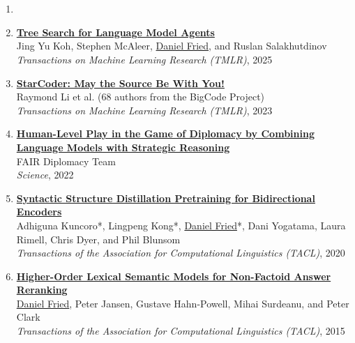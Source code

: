 \section{}

\begin{enumerate}[leftmargin=-1mm,partopsep=0pt]

\item[]

\item \href{https://arxiv.org/abs/2407.01476}{\textbf{Tree Search for Language Model Agents}} \\
  Jing Yu Koh, Stephen McAleer, \underline{Daniel Fried}, and Ruslan Salakhutdinov\\
  \emph{Transactions on Machine Learning Research (TMLR)}, 2025

\item \href{https://arxiv.org/abs/2305.06161}{\textbf{StarCoder: May the Source Be With You!}} \\
  Raymond Li et al. (68 authors from the BigCode Project)\\
  \emph{Transactions on Machine Learning Research (TMLR)}, 2023

\item \href{https://www.science.org/doi/10.1126/science.ade9097}{\textbf{Human-Level Play in the Game of Diplomacy by Combining Language Models with Strategic Reasoning}} \\
  FAIR Diplomacy Team\\
  \emph{Science}, 2022

\item \href{https://www.mitpressjournals.org/doi/full/10.1162/tacl_a_00345}{\textbf{Syntactic Structure Distillation Pretraining for Bidirectional Encoders}} \\
  Adhiguna Kuncoro*, Lingpeng Kong*, \underline{Daniel Fried}*, Dani Yogatama, Laura Rimell, Chris Dyer, and Phil Blunsom\\
  \emph{Transactions of the Association for Computational Linguistics (TACL)}, 2020

\item \href{https://people.eecs.berkeley.edu/~dfried/papers/tacl2015-qa.pdf}{\textbf{Higher-Order Lexical Semantic Models for Non-Factoid Answer Reranking}} \\
  \underline{Daniel Fried}, Peter Jansen, Gustave Hahn-Powell, Mihai Surdeanu, and Peter Clark\\
  \emph{Transactions of the Association for Computational Linguistics (TACL)}, 2015


\end{enumerate}
